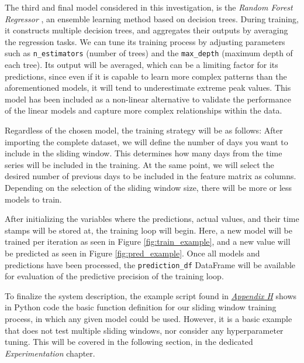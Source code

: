 \documentclass[12pt]{report} %
\begin{document}
The third and final model considered in this investigation, is the \textit{Random Forest Regressor} \cite{random_forest_regressor}, an ensemble learning method based on decision trees. During training, it constructs multiple decision trees, and aggregates their outputs by averaging the regression tasks. We can tune its training process by adjusting parameters such as \verb|n_estimators| (number of trees) and the \verb|max_depth| (maximum depth of each tree). Its output will be averaged, which can be a limiting factor for its predictions, since even if it is capable to learn more complex patterns than the aforementioned models, it will tend to underestimate extreme peak values. This model has been included as a non-linear alternative to validate the performance of the linear models and capture more complex relationships within the data.

Regardless of the chosen model, the training strategy will be as follows: After importing the complete dataset, we will define the number of days you want to include in the sliding window. This determines how many days from the time series will be included in the training. At the same point, we will select the desired number of previous days to be included in the feature matrix as columns. Depending on the selection of the sliding window size, there will be more or less models to train.

After initializing the variables where the predictions, actual values, and their time stamps will be stored at, the training loop will begin. Here, a new model will be trained per iteration as seen in Figure \ref{fig:train_example}, and a new value will be predicted as seen in Figure \ref{fig:pred_example}. Once all models and predictions have been processed, the \small{\verb|prediction_df|} DataFrame will be available for evaluation of the predictive precision of the training loop.

To finalize the system description, the example script found in \textit{\hyperref[app:appendix_h_example_basic_training_process]{Appendix H}} shows in Python code the basic function definition for our sliding window training process, in which any given model could be used. However, it is a basic example that does not test multiple sliding windows, nor consider any hyperparameter tuning. This will be covered in the following section, in the dedicated \textit{Experimentation} chapter.



\end{document}
